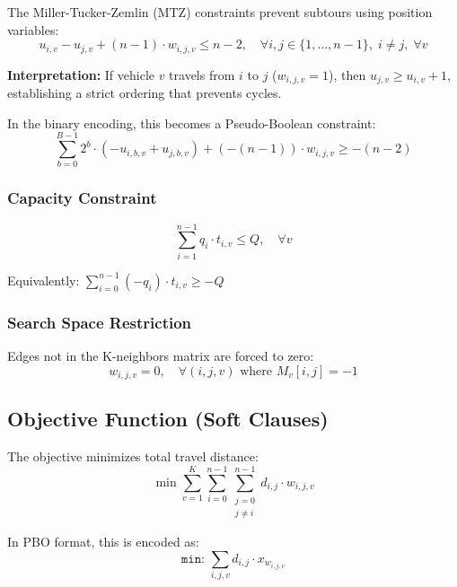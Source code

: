 \documentclass[12pt,a4paper]{article}
\theoremstyle{definition}
\begin{document}
The Miller-Tucker-Zemlin (MTZ) constraints prevent subtours using position variables:
\begin{equation}
u_{i,v} - u_{j,v} + (n-1) \cdot w_{i,j,v} \leq n - 2, \quad \forall i,j \in \{1, \ldots, n-1\}, \; i \neq j, \; \forall v \tag{C11}
\end{equation}

\textbf{Interpretation:} If vehicle $v$ travels from $i$ to $j$ ($w_{i,j,v} = 1$), then $u_{j,v} \geq u_{i,v} + 1$, establishing a strict ordering that prevents cycles.

In the binary encoding, this becomes a Pseudo-Boolean constraint:
\begin{equation}
\sum_{b=0}^{B-1} 2^b \cdot (-u_{i,b,v} + u_{j,b,v}) + (-(n-1)) \cdot w_{i,j,v} \geq -(n-2)
\end{equation}

\subsubsection{Capacity Constraint}

\begin{equation}
\sum_{i=1}^{n-1} q_i \cdot t_{i,v} \leq Q, \quad \forall v \tag{C12}
\end{equation}

Equivalently: $\sum_{i=0}^{n-1} (-q_i) \cdot t_{i,v} \geq -Q$

\subsubsection{Search Space Restriction}

Edges not in the K-neighbors matrix are forced to zero:
\begin{equation}
w_{i,j,v} = 0, \quad \forall (i,j,v) \text{ where } M_v[i,j] = -1 \tag{C13}
\end{equation}

\subsection{Objective Function (Soft Clauses)}

The objective minimizes total travel distance:
\begin{equation}
\min \sum_{v=1}^{K} \sum_{i=0}^{n-1} \sum_{\substack{j=0 \\ j \neq i}}^{n-1} d_{i,j} \cdot w_{i,j,v}
\end{equation}

In PBO format, this is encoded as:
\[
\texttt{min: } \sum_{i,j,v} d_{i,j} \cdot x_{w_{i,j,v}}
\]
\end{document}
